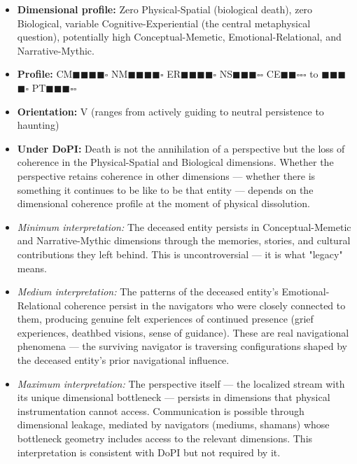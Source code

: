 \begin{itemize}[nosep,leftmargin=*]
  \item \textbf{Dimensional profile:} Zero Physical-Spatial (biological death), zero Biological, variable Cognitive-Experiential (the central metaphysical question), potentially high Conceptual-Memetic, Emotional-Relational, and Narrative-Mythic.
  \item \textbf{Profile:} CM$\blacksquare$$\blacksquare$$\blacksquare$$\blacksquare$$\square$ NM$\blacksquare$$\blacksquare$$\blacksquare$$\blacksquare$$\square$ ER$\blacksquare$$\blacksquare$$\blacksquare$$\blacksquare$$\square$ NS$\blacksquare$$\blacksquare$$\blacksquare$$\square$$\square$ CE$\blacksquare$$\blacksquare$$\square$$\square$$\square$ to $\blacksquare$$\blacksquare$$\blacksquare$$\blacksquare$$\square$ PT$\blacksquare$$\blacksquare$$\blacksquare$$\square$$\square$
  \item \textbf{Orientation:} V (ranges from actively guiding to neutral persistence to haunting)
  \item \textbf{Under DoPI:} Death is not the annihilation of a perspective but the loss of coherence in the Physical-Spatial and Biological dimensions. Whether the perspective retains coherence in other dimensions — whether there is something it continues to be like to be that entity — depends on the dimensional coherence profile at the moment of physical dissolution.
  \item \textit{Minimum interpretation:} The deceased entity persists in Conceptual-Memetic and Narrative-Mythic dimensions through the memories, stories, and cultural contributions they left behind. This is uncontroversial — it is what "legacy" means.
  \item \textit{Medium interpretation:} The patterns of the deceased entity's Emotional-Relational coherence persist in the navigators who were closely connected to them, producing genuine felt experiences of continued presence (grief experiences, deathbed visions, sense of guidance). These are real navigational phenomena — the surviving navigator is traversing configurations shaped by the deceased entity's prior navigational influence.
  \item \textit{Maximum interpretation:} The perspective itself — the localized stream with its unique dimensional bottleneck — persists in dimensions that physical instrumentation cannot access. Communication is possible through dimensional leakage, mediated by navigators (mediums, shamans) whose bottleneck geometry includes access to the relevant dimensions. This interpretation is consistent with DoPI but not required by it.

\end{itemize}
